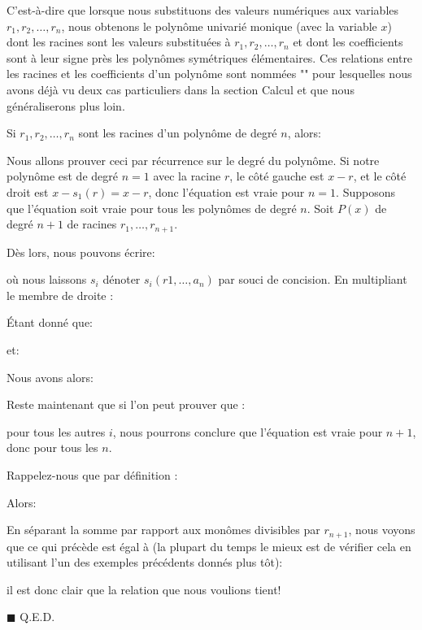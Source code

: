 	C'est-à-dire que lorsque nous substituons des valeurs numériques aux variables $r_1,r_2,\dots,r_n$, nous obtenons le polynôme univarié monique (avec la variable $x$) dont les racines sont les valeurs substituées à $r_1,r_2,\dots, r_n$ et dont les coefficients sont à leur signe près les polynômes symétriques élémentaires. Ces relations entre les racines et les coefficients d'un polynôme sont nommées "" pour lesquelles nous avons déjà vu deux cas particuliers dans la section Calcul et que nous généraliserons plus loin.
	\begin{theorem}
	Si $r_1,r_2,\ldots, r_n$ sont les racines d'un polynôme de degré $n$, alors:
	
	\end{theorem}
	\begin{dem}
	Nous allons prouver ceci par récurrence sur le degré du polynôme. Si notre polynôme est de degré $n = 1$ avec la racine $r$, le côté gauche est $x-r$, et le côté droit est $x-s_1(r)= x-r$, donc l'équation est vraie pour $n = 1$. Supposons que l'équation soit vraie pour tous les polynômes de degré $n$. Soit $P(x)$ de degré $n+1$ de racines $r_1,\ldots,r_{n+1}$.

    Dès lors, nous pouvons écrire:
    
	où nous laissons $s_i$ dénoter $s_i(r1, \ldots , a_n)$ par souci de concision. En multipliant le membre de droite :
	
	Étant donné que:
	
	et:
	
	Nous avons alors:
	
	Reste maintenant que si l'on peut prouver que :
	
	pour tous les autres $i$, nous pourrons conclure que l'équation est vraie pour $n+1$, donc pour tous les $n$.
	
	Rappelez-nous que par définition :
	
	Alors:
	
	En séparant la somme par rapport aux monômes divisibles par $r_{n+1}$, nous voyons que ce qui précède est égal à (la plupart du temps le mieux est de vérifier cela en utilisant l'un des exemples précédents donnés plus tôt):
	
	il est donc clair que la relation que nous voulions tient!
	\begin{flushright}
		$\blacksquare$  Q.E.D.
	\end{flushright}
	\end{dem}
	
